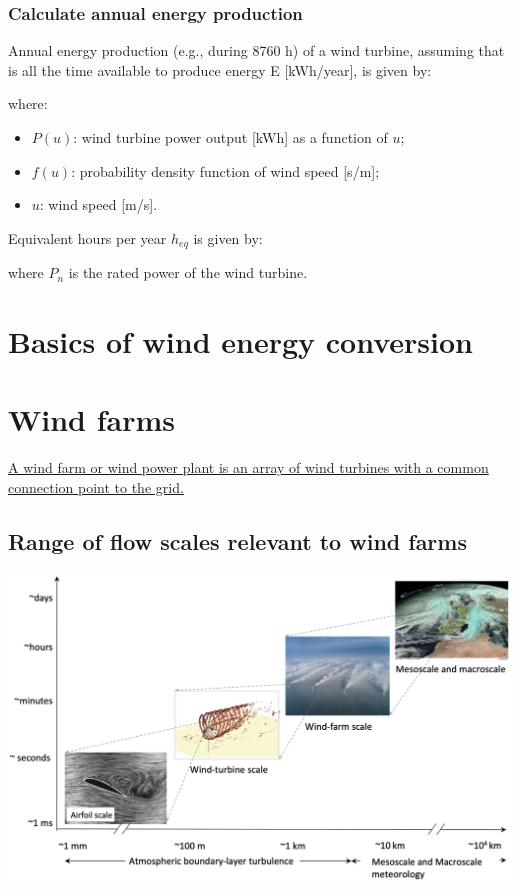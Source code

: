 \documentclass{article}
\begin{document}
\subsubsection{Calculate annual energy production}
Annual energy production (e.g., during 8760 h) of a wind
turbine, assuming that is all the time available to produce
energy E [kWh/year], is given by:
\\

where:
\begin{itemize}
    \item $P(u)$: wind turbine power output [kWh] as a function of $u$;
    \item $f(u)$: probability density function of wind speed [s/m];
    \item $u$: wind speed [m/s].
\end{itemize}

Equivalent hours per year $h_{eq}$ is given by:

where $P_n$ is the rated power of the wind turbine.

\section{Basics of wind energy conversion}


\newpage
\section{Wind farms}
\underline{A wind farm or wind power plant is an array of wind turbines with a
common connection point to the grid.}

\subsection{Range of flow scales relevant to wind farms}
\begin{center}
    \includegraphics[width=.8\textwidth]{media/flow_range.png}
\end{center}
\end{document}
